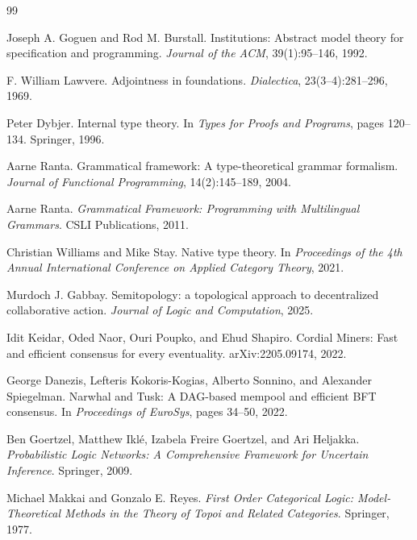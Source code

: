 \documentclass[11pt]{article}
\begin{document}
\begin{thebibliography}{99}

Joseph A. Goguen and Rod M. Burstall.
\newblock Institutions: Abstract model theory for specification and programming.
\newblock \emph{Journal of the ACM}, 39(1):95--146, 1992.

F. William Lawvere.
\newblock Adjointness in foundations.
\newblock \emph{Dialectica}, 23(3--4):281--296, 1969.

Peter Dybjer.
\newblock Internal type theory.
\newblock In \emph{Types for Proofs and Programs}, pages 120--134. Springer, 1996.

Aarne Ranta.
\newblock Grammatical framework: A type-theoretical grammar formalism.
\newblock \emph{Journal of Functional Programming}, 14(2):145--189, 2004.

Aarne Ranta.
\newblock \emph{Grammatical Framework: Programming with Multilingual Grammars}.
\newblock CSLI Publications, 2011.

Christian Williams and Mike Stay.
\newblock Native type theory.
\newblock In \emph{Proceedings of the 4th Annual International Conference on Applied Category Theory}, 2021.

Murdoch J. Gabbay.
\newblock Semitopology: a topological approach to decentralized collaborative action.
\newblock \emph{Journal of Logic and Computation}, 2025.

Idit Keidar, Oded Naor, Ouri Poupko, and Ehud Shapiro.
\newblock Cordial Miners: Fast and efficient consensus for every eventuality.
\newblock arXiv:2205.09174, 2022.

George Danezis, Lefteris Kokoris-Kogias, Alberto Sonnino, and Alexander Spiegelman.
\newblock Narwhal and Tusk: A DAG-based mempool and efficient BFT consensus.
\newblock In \emph{Proceedings of EuroSys}, pages 34--50, 2022.

Ben Goertzel, Matthew Ikl{\'e}, Izabela Freire Goertzel, and Ari Heljakka.
\newblock \emph{Probabilistic Logic Networks: A Comprehensive Framework for Uncertain Inference}.
\newblock Springer, 2009.

Michael Makkai and Gonzalo E. Reyes.
\newblock \emph{First Order Categorical Logic: Model-Theoretical Methods in the Theory of Topoi and Related Categories}.
\newblock Springer, 1977.

\end{thebibliography}
\end{document}
